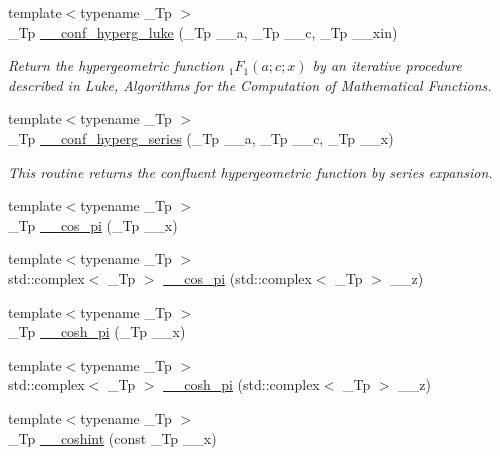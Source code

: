\begin{DoxyCompactItemize}
{\footnotesize template$<$typename \+\_\+\+Tp $>$ }\\\+\_\+\+Tp \hyperlink{namespacestd_1_1____detail_ac3b4c72998f9d7deb6d79bda93220e58}{\+\_\+\+\_\+conf\+\_\+hyperg\+\_\+luke} (\+\_\+\+Tp \+\_\+\+\_\+a, \+\_\+\+Tp \+\_\+\+\_\+c, \+\_\+\+Tp \+\_\+\+\_\+xin)
\begin{DoxyCompactList}\small\item\em Return the hypergeometric function $ {}_1F_1(a;c;x) $ by an iterative procedure described in Luke, Algorithms for the Computation of Mathematical Functions. \end{DoxyCompactList}\item 
{\footnotesize template$<$typename \+\_\+\+Tp $>$ }\\\+\_\+\+Tp \hyperlink{namespacestd_1_1____detail_a5f701a63e17238132405dd209660fc1d}{\+\_\+\+\_\+conf\+\_\+hyperg\+\_\+series} (\+\_\+\+Tp \+\_\+\+\_\+a, \+\_\+\+Tp \+\_\+\+\_\+c, \+\_\+\+Tp \+\_\+\+\_\+x)
\begin{DoxyCompactList}\small\item\em This routine returns the confluent hypergeometric function by series expansion. \end{DoxyCompactList}\item 
{\footnotesize template$<$typename \+\_\+\+Tp $>$ }\\\+\_\+\+Tp \hyperlink{namespacestd_1_1____detail_abfdaa500e1321747a0ad391ca3416a0b}{\+\_\+\+\_\+cos\+\_\+pi} (\+\_\+\+Tp \+\_\+\+\_\+x)
\item 
{\footnotesize template$<$typename \+\_\+\+Tp $>$ }\\std\+::complex$<$ \+\_\+\+Tp $>$ \hyperlink{namespacestd_1_1____detail_a0332c7fb29ed7be543103adc8d04d39d}{\+\_\+\+\_\+cos\+\_\+pi} (std\+::complex$<$ \+\_\+\+Tp $>$ \+\_\+\+\_\+z)
\item 
{\footnotesize template$<$typename \+\_\+\+Tp $>$ }\\\+\_\+\+Tp \hyperlink{namespacestd_1_1____detail_ae6e440447e88191b3cd19daaf7fda96e}{\+\_\+\+\_\+cosh\+\_\+pi} (\+\_\+\+Tp \+\_\+\+\_\+x)
\item 
{\footnotesize template$<$typename \+\_\+\+Tp $>$ }\\std\+::complex$<$ \+\_\+\+Tp $>$ \hyperlink{namespacestd_1_1____detail_a257e13bd4fa9711a87ea68a783ee40d9}{\+\_\+\+\_\+cosh\+\_\+pi} (std\+::complex$<$ \+\_\+\+Tp $>$ \+\_\+\+\_\+z)
\item 
{\footnotesize template$<$typename \+\_\+\+Tp $>$ }\\\+\_\+\+Tp \hyperlink{namespacestd_1_1____detail_ad48a89a591f7b58a047f072e6e383663}{\+\_\+\+\_\+coshint} (const \+\_\+\+Tp \+\_\+\+\_\+x)

\end{DoxyCompactItemize}
